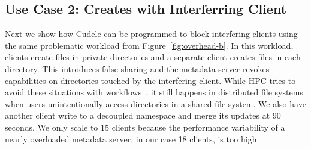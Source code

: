 %
%
%
%
%
%
%
%
%
%
%

\subsection{Use Case 2: Creates with Interferring Client}

Next we show how Cudele can be programmed to block interfering clients using
the same problematic workload from Figure~\ref{fig:overhead-b}. In this
workload, clients create files in private directories and a separate client
creates files in each directory. This introduces false sharing and the metadata
server revokes capabilities on directories touched by the interfering client. While
HPC tries to avoid these situations with
workflows~\cite{zheng:pdsw2014-batchfs, zheng:pdsw2015-deltafs}, it still
happens in distributed file systems when users unintentionally access
directories in a shared file system.  We also have another client write to a
decoupled namespace and merge its updates at 90 seconds.  We only scale to 15
clients because the performance variability of a nearly overloaded metadata
server, in our case 18 clients, is too high.

